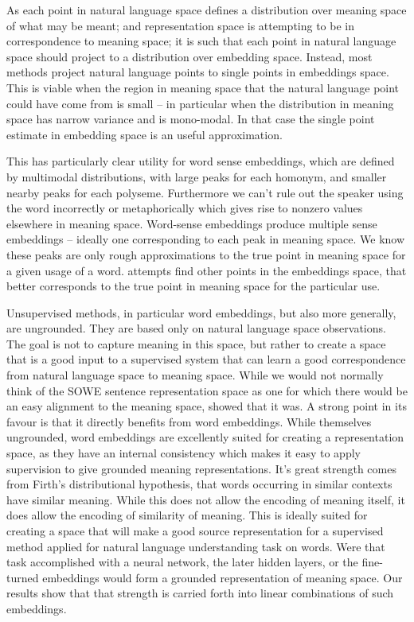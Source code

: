 \documentclass{book}
\begin{document}
As each point in natural language space defines a distribution over meaning space of what may be meant;
and representation space is attempting to be in correspondence to meaning space;
it is such that each point in natural language space should project to a distribution over embedding space.
Instead, most methods project natural language points to single points in embeddings space.
This is viable when the region in meaning space that the natural language point could have come from is small -- in particular when the distribution in meaning space has narrow variance and is mono-modal.
In that case the single point estimate in embedding space is an useful approximation.


This has particularly clear utility for word sense embeddings,
which are defined by multimodal distributions,
with large peaks for each homonym, and smaller nearby peaks for each polyseme.
Furthermore we can't rule out the speaker using the word incorrectly or metaphorically which gives rise to nonzero values elsewhere in meaning space.
Word-sense embeddings produce multiple sense embeddings -- ideally one corresponding to each peak in meaning space.
We know these peaks are only rough approximations to the true point in meaning space for a given usage of a word.
 attempts find other points in the embeddings space, that better corresponds to the true point in meaning space for the particular use.


Unsupervised methods, in particular word embeddings, but also more generally, are ungrounded.
They are based only on natural language space observations.
The goal is not to capture meaning in this space,
but rather to create a space that is a good input to a supervised system that can learn a good correspondence from natural language space to meaning space. 
While we would not normally think of the SOWE sentence representation space as one for which there would be an easy alignment to the meaning space,
 showed that it was.
A strong point in its favour is that it directly benefits from word embeddings.
While themselves ungrounded, word embeddings are excellently suited for creating a representation space, as they have an internal consistency which makes it easy to apply supervision to give grounded meaning representations.
It's great strength comes from Firth's distributional hypothesis, that words occurring in similar contexts have similar meaning.
While this does not allow the encoding of meaning itself, it does allow the encoding of similarity of meaning.
This is ideally suited for creating a space that will make a good source representation for a supervised method applied for natural language understanding task on words.
Were that task accomplished with a neural network, the later hidden layers, or the fine-turned embeddings would form a grounded representation of meaning space.
Our results show that that strength is carried forth into linear combinations of such embeddings.
\end{document}

